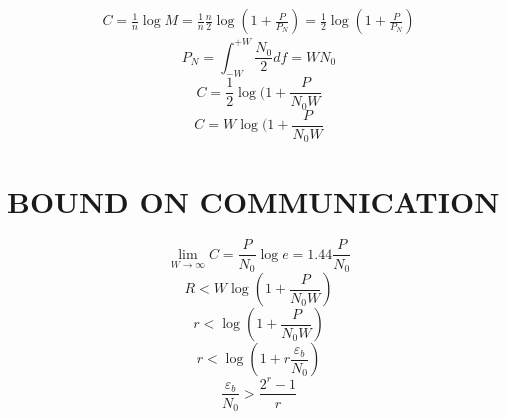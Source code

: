 \documentclass[a4paper, 13pt]{report}
\begin{document}
\begin{equation}
\begin{split}
    C = \frac{1}{n} \log M
    = \frac{1}{n} \frac{n}{2} \log(1 + \frac{P}{P_N})
    = \frac{1}{2} \log (1+\frac{P}{P_N})
\end{split}    
\end{equation}
\begin{equation}
    P_N = \int_{-W}^{+W}\frac{N_0}{2}df = WN_0
\end{equation}
\begin{equation}
    C = \frac{1}{2}\log (1 + \frac{P}{N_0W}
\end{equation}
\begin{equation}
    C = W\log (1 + \frac{P}{N_0W}
\end{equation}



\chapter{BOUND ON COMMUNICATION}
\begin{equation}
    \lim_{W\rightarrow\infty} C = \frac{P}{N_0}\log e = 1.44\frac{P}{N_0}
\end{equation}
\begin{equation}
    R < W\log (1 + \frac{P}{N_0W})
\end{equation}
\begin{equation}
    r < \log ( 1 + \frac{P}{N_0W})
\end{equation}
\begin{equation}
    r < \log(1 + r\frac{\varepsilon_b}{N_0})
\end{equation}
\begin{equation}
    \frac{\varepsilon_b}{N_0} > \frac{2^r -1}{r}
\end{equation}
\end{document}
